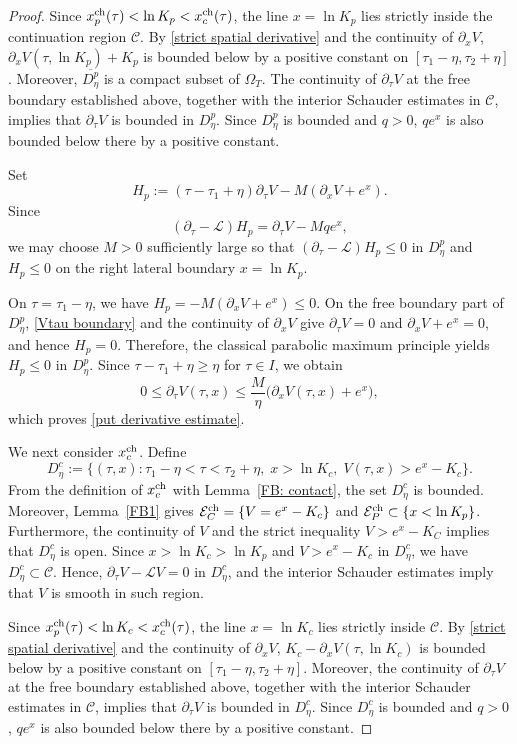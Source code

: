\documentclass[11pt, a4paper, leqno]{amsart}
\numberwithin{equation}{section}
\theoremstyle{plain}
\theoremstyle{definition}
\theoremstyle{remark}
\def\leq{\leqslant}
\def\geq{\geqslant}
\begin{document}
{\begin{proof}
Since
$x_p^{\rm ch}(\tau)<\ln K_p<x_c^{\rm ch}(\tau)$,
the line $x=\ln K_p$ lies strictly inside the continuation region $\mathcal C$.
By \eqref{strict spatial derivative} and the continuity of
$\partial_xV$,
$\partial_xV(\tau,\ln K_p)+K_p$ is bounded below by a positive
constant on $[\tau_1-\eta,\tau_2+\eta]$.
Moreover, $\overline{D_\eta^p}$ is a compact subset of $\Omega_T$.
The continuity of $\partial_\tau V$ at the free boundary established
above, together with the interior Schauder estimates in $\mathcal C$,
implies that $\partial_\tau V$ is bounded in $D_\eta^p$.
Since $D_\eta^p$ is bounded and $q>0$, $qe^x$ is also bounded below
there by a positive constant.

Set
\[
    H_p
    :=
    (\tau-\tau_1+\eta)\partial_\tau V
    -
    M(\partial_xV+e^x).
\]
Since
\[
    (\partial_\tau-\mathcal L)H_p
    =
    \partial_\tau V-Mqe^x,
\]
we may choose $M>0$ sufficiently large so that
$(\partial_\tau-\mathcal L)H_p\leq0$ in $D_\eta^p$ and
$H_p\leq0$ on the right lateral boundary $x=\ln K_p$.

On $\tau=\tau_1-\eta$, we have
$H_p=-M(\partial_xV+e^x)\leq0$.
On the free boundary part of $D_\eta^p$,
\eqref{Vtau boundary} and the continuity of $\partial_xV$ give
$\partial_\tau V=0$ and $\partial_xV+e^x=0$, and hence $H_p=0$.
Therefore, the classical parabolic maximum principle
\cite[Corollary 2.5]{LIE96} yields $H_p\leq0$ in $D_\eta^p$.
Since $\tau-\tau_1+\eta\geq\eta$ for $\tau\in I$, we obtain
\[
    0\leq\partial_\tau V(\tau,x)
    \leq
    \frac{M}{\eta}
    \bigl(\partial_xV(\tau,x)+e^x\bigr),
\]
which proves \eqref{put derivative estimate}.

We next consider $x_c^{\rm ch}$. Define
\[
    D_\eta^c
    :=
    \{(\tau,x):
    \tau_1-\eta<\tau<\tau_2+\eta,\;
    x>\ln K_c,\;
    V(\tau,x)>e^x-K_c\}.
\]
From the definition of $x_c^{\rm ch}$ with Lemma~\ref{FB: contact}, the set $D_\eta^c$ is bounded.
Moreover, Lemma~\ref{FB1} gives
$\mathcal E_C^{\rm ch}=\{V=e^x-K_c\}$ and
$\mathcal E_P^{\rm ch}\subset\{x<\ln K_p\}$.
Furthermore, the continuity of $V$ and the strict inequality $V>e^x-K_C$ implies that $D_\eta^c$ is open.
Since $x>\ln K_c>\ln K_p$ and $V>e^x-K_c$ in $D_\eta^c$,
we have $D_\eta^c\subset\mathcal C$. Hence,
$\partial_\tau V-\mathcal LV=0$ in $D_\eta^c$, and the interior
Schauder estimates imply that $V$ is smooth in such region.

Since
$x_p^{\rm ch}(\tau)<\ln K_c<x_c^{\rm ch}(\tau)$,
the line $x=\ln K_c$ lies strictly inside $\mathcal C$.
By \eqref{strict spatial derivative} and the continuity of
$\partial_xV$,
$K_c-\partial_xV(\tau,\ln K_c)$ is bounded below by a positive
constant on $[\tau_1-\eta,\tau_2+\eta]$.
Moreover, the continuity of $\partial_\tau V$ at the free boundary
established above, together with the interior Schauder estimates in
$\mathcal C$, implies that $\partial_\tau V$ is bounded in
$D_\eta^c$. Since $D_\eta^c$ is bounded and $q>0$, $qe^x$ is also
bounded below there by a positive constant.


\end{proof}}
\end{document}
